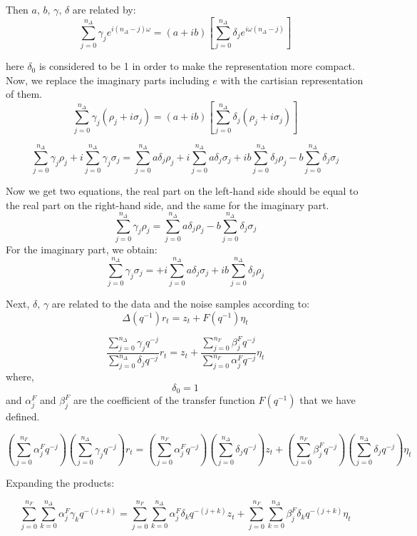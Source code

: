 \begin{enumerate}
        Then $a,\,b,\,\gamma,\,\delta$ are related by:
\[
\sum_{j=0}^{n_\Delta} \gamma_j e^{i(n_\Delta-j)\omega} 
= 
(a + i b) 
\left[ 
\sum_{j=0}^{n_\Delta} \delta_j e^{i\omega (n_\Delta - j)} 
\right]
\]

here $\delta_0$ is considered to be 1 in order to make the representation more compact. Now, we replace the imaginary parts including $e$ with the cartisian representation of them.
\[
\sum_{j=0}^{n_\Delta} \gamma_j \left( \rho_j + i \sigma_j \right) 
= 
(a + i b) 
\left[ 
\sum_{j=0}^{n_\Delta} \delta_j \left( \rho_j + i \sigma_j \right) 
\right]
\]

\[
\sum_{j=0}^{n_\Delta} \gamma_j \rho_j + i \sum_{j=0}^{n_\Delta} \gamma_j \sigma_j 
= 
\sum_{j=0}^{n_\Delta} a \delta_j \rho_j + i \sum_{j=0}^{n_\Delta} a \delta_j \sigma_j 
+ i b \sum_{j=0}^{n_\Delta} \delta_j \rho_j - b \sum_{j=0}^{n_\Delta} \delta_j \sigma_j
\]

Now we get two equations, the real part on the left-hand side should be equal to the real part on the right-hand side, and the same for the imaginary part.
\[
\sum_{j=0}^{n_\Delta} \gamma_j \rho_j = \sum_{j=0}^{n_\Delta} a \delta_j \rho_j - b \sum_{j=0}^{n_\Delta} \delta_j \sigma_j
\]
For the imaginary part, we obtain:
\[
\sum_{j=0}^{n_\Delta} \gamma_j \sigma_j = + i \sum_{j=0}^{n_\Delta} a \delta_j \sigma_j 
+ i b \sum_{j=0}^{n_\Delta} \delta_j \rho_j
\]

Next, $\delta,\,\gamma$ are related to the data and the noise samples according to:
\[
\Delta(q^{-1})r_t = z_t + F(q^{-1})\eta_t
\]

\[
\frac{\sum_{j = 0}^{n_{\Delta}}\gamma_j q^{-j}}{\sum_{j = 0}^{n_{\Delta}}\delta_j q^{-j}}r_t = z_t + 
\frac{\sum_{j = 0}^{n_F}\beta_j^F q^{-j}}{\sum_{j = 0}^{n_F}\alpha_j^F q^{-j}}\eta_t
\]
where, 
\[
\delta_0 =1
\]
and $\alpha_j^F$ and $\beta_j^F$ are the coefficient of the transfer function $F(q^{-1})$ that we have defined.

\[
\left( \sum_{j=0}^{n_F} \alpha_j^F q^{-j} \right) 
\left( \sum_{j=0}^{n_\Delta} \gamma_j q^{-j} \right) r_t =
\left( \sum_{j=0}^{n_F} \alpha_j^F q^{-j} \right) 
\left( \sum_{j=0}^{n_\Delta} \delta_j q^{-j} \right) z_t +
\left( \sum_{j=0}^{n_F} \beta_j^F q^{-j} \right) 
\left( \sum_{j=0}^{n_\Delta} \delta_j q^{-j} \right) \eta_t
\]

Expanding the products:

\[
\sum_{j=0}^{n_F} \sum_{k=0}^{n_\Delta} \alpha_j^F \gamma_k q^{-(j+k)} =
\sum_{j=0}^{n_F} \sum_{k=0}^{n_\Delta} \alpha_j^F \delta_k q^{-(j+k)} z_t +
\sum_{j=0}^{n_F} \sum_{k=0}^{n_\Delta} \beta_j^F \delta_k q^{-(j+k)} \eta_t
\]


\end{enumerate}
